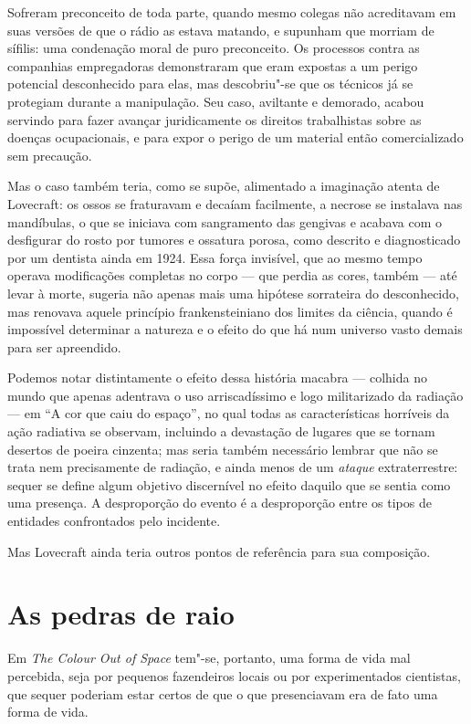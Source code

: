 Sofreram preconceito de toda parte, quando mesmo colegas não acreditavam
em suas versões de que o rádio as estava matando, e supunham que morriam
de sífilis: uma condenação moral de puro preconceito. Os processos
contra as companhias empregadoras demonstraram que eram expostas a um
perigo potencial desconhecido para elas, mas descobriu"-se que os
técnicos já se protegiam durante a manipulação. Seu caso, aviltante e
demorado, acabou servindo para fazer avançar juridicamente os direitos
trabalhistas sobre as doenças ocupacionais, e para expor o perigo de um
material então comercializado sem precaução.

Mas o caso também teria, como se supõe, alimentado a imaginação atenta
de Lovecraft: os ossos se fraturavam e decaíam facilmente, a necrose se
instalava nas mandíbulas, o que se iniciava com sangramento das gengivas
e acabava com o desfigurar do rosto por tumores e ossatura porosa, como
descrito e diagnosticado por um dentista ainda em 1924. Essa força
invisível, que ao mesmo tempo operava modificações completas no corpo
--- que perdia as cores, também --- até levar à morte, sugeria não
apenas mais uma hipótese sorrateira do desconhecido, mas renovava aquele
princípio frankensteiniano dos limites da ciência, quando é impossível
determinar a natureza e o efeito do que há num universo vasto demais
para ser apreendido.

Podemos notar distintamente o efeito dessa história macabra --- colhida
no mundo que apenas adentrava o uso arriscadíssimo e logo militarizado
da radiação --- em ``A cor que caiu do espaço'', no qual todas as
características horríveis da ação radiativa se observam, incluindo a
devastação de lugares que se tornam desertos de poeira cinzenta; mas
seria também necessário lembrar que não se trata nem precisamente de
radiação, e ainda menos de um \textit{ataque} extraterrestre: sequer se
define algum objetivo discernível no efeito daquilo que se sentia como
uma presença. A desproporção do evento é a desproporção entre os tipos
de entidades confrontados pelo incidente.

Mas Lovecraft ainda teria outros pontos de referência para sua
composição.

\section*{As pedras de raio}

Em \textit{The Colour Out of Space} tem"-se, portanto, uma forma de vida mal
percebida, seja por pequenos fazendeiros locais ou por experimentados
cientistas, que sequer poderiam estar certos de que o que presenciavam
era de fato uma forma de vida.

